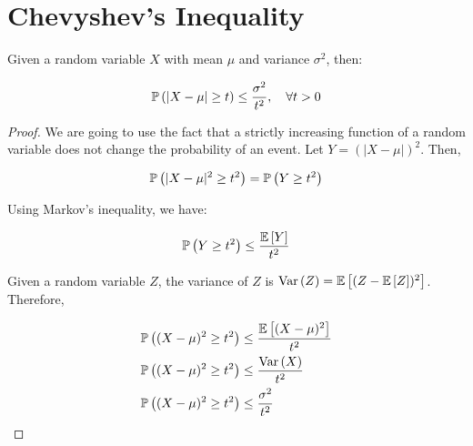 \section{Chevyshev's Inequality}

Given a random variable $X$ with mean $\mu$ and variance $\sigma^2$, then:

\begin{align*}
\mathbb{P}\left(|X - \mu| \geq t\right) \leq \frac{\sigma^2}{t^2}, \quad \forall t > 0
\end{align*}

\begin{proof}
We are going to use the fact that a strictly increasing function of a random variable does not change the probability of an event. Let $Y = (|X - \mu|)^2$. Then,

\begin{align*}
\mathbb{P}\left(|X - \mu|^2 \geq t^2\right) &= \mathbb{P}\left(Y \geq t^2\right) \\
\end{align*}

Using Markov's inequality, we have:

\begin{align*}
\mathbb{P}\left(Y \geq t^2\right) &\leq \frac{\mathbb{E}\left[Y\right]}{t^2} \\
\end{align*}

Given a random variable $Z$, the variance of $Z$ is $\text{Var}\left(Z\right) = \mathbb{E}\left[(Z - \mathbb{E}\left[Z\right])^2\right]$. Therefore,

\begin{align*}
\mathbb{P}\left((X - \mu)^2 \geq t^2\right) &\leq \frac{\mathbb{E}\left[(X - \mu)^2\right]}{t^2} \\
\mathbb{P}\left((X - \mu)^2 \geq t^2\right) &\leq \frac{\text{Var}\left(X\right)}{t^2} \\
\mathbb{P}\left((X - \mu)^2 \geq t^2\right) &\leq \frac{\sigma^2}{t^2} \\
\end{align*}

\end{proof}
